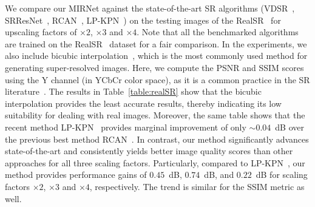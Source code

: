 \documentclass[runningheads]{llncs}
\begin{document}
We compare our MIRNet against the state-of-the-art SR algorithms (VDSR~\cite{VDSR}, SRResNet~\cite{SRResNet}, RCAN~\cite{RCAN}, LP-KPN~\cite{RealSR}) on the testing images of the RealSR~\cite{RealSR} for upscaling factors of $\times2$, $\times3$ and $\times4$. 
Note that all the benchmarked algorithms are trained on the RealSR~\cite{RealSR} dataset for a fair comparison. 
In the experiments, we also include bicubic interpolation~\cite{keys1981cubic}, which is the most commonly used method for generating super-resolved images. 
Here, we compute the PSNR and SSIM scores using the Y channel (in YCbCr color space), as it is a common practice in the SR literature~\cite{RCAN,RealSR,wang2019deep,anwar2019deep}. 
The results in Table~\ref{table:realSR} show that the bicubic interpolation provides the least accurate results, thereby indicating its low suitability for dealing with real images. 
Moreover, the same table shows that the recent method LP-KPN~\cite{RealSR} provides marginal improvement of only $\sim0.04$~dB over the previous best method RCAN~\cite{RCAN}.
In contrast, our method significantly advances state-of-the-art and consistently yields better image quality scores than other approaches for all three scaling factors.
Particularly, compared to LP-KPN~\cite{RealSR}, our method provides performance gains of $0.45$~dB, $0.74$~dB, and $0.22$~dB for scaling factors $\times2$, $\times3$ and $\times4$, respectively. The trend is similar for the SSIM metric as well.   
\end{document}
